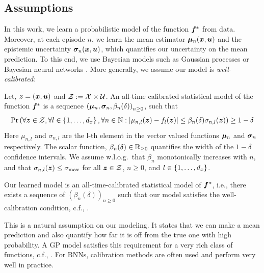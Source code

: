 \subsection{Assumptions}
In this work, we learn a probabilistic model of the function ${\bm{f}}^{*}$ from data. Moreover, at each episode $n$, we learn the mean estimator ${\bm{\mu}}_n({\bm{x}}, {\bm{u}})$ and the epistemic uncertainty ${\bm{\sigma}}_n({\bm{x}}, {\bm{u}})$, which quantifies our uncertainty on the mean prediction. 
To this end, we use Bayesian models such as Gaussian processes \citep[GPs,][]{rasmussen2005gp} or Bayesian neural networks  \citep[BNNs,][]{bnnsurvey}. More generally, we assume our model is {\em well-calibrated}:
\begin{definition}
Let, ${\bm{z}} = ({\bm{x}}, {\bm{u}})$ and ${\mathcal{Z}} := {\mathcal{X}} \times {\mathcal{U}}$. 
 An all-time calibrated statistical model of the function ${\bm{f}}^*$ is a sequence $\left({\bm{\mu}}_n, {\bm{\sigma}}_n, \beta_n(\delta)\right)_{n\geq 0}$, such that
\begin{align*}
    \Pr \left(\forall {\bm{z}} \in {\mathcal{Z}}, \forall l \in \left\{1, \ldots, d_x\right\}, \forall n \in \mathbb{N}: \left\lvert\mu_{n, l}({\bm{z}}) - f_l({\bm{z}})\right\rvert \le \beta_n(\delta) \sigma_{n, l}({\bm{z}}) \right) \geq 1 - \delta 
\end{align*}
 Here $\mu_{n, l}$ and $\sigma_{n, l}$ are the l-th element in the vector valued functions ${\bm{\mu}}_n$ and ${\bm{\sigma}}_n$ respectively. The scalar function, $\beta_n(\delta) \in \mathbb{R}_{\geq 0}$ quantifies the width of the $1-\delta$ confidence intervals. We assume w.l.o.g.~that $\beta_n$ monotonically increases with $n$, and that $\sigma_{n, l}({\bm{z}}) \leq \sigma_{\max}$ for all ${\bm{z}} \in {\mathcal{Z}}$, $n \geq 0$, and $l \in \left\{1, \ldots, d_x\right\}$.
 \label{def:all_time_calibrated_model}
\end{definition}
\begin{assumption}
\label{assumption: Well Calibration Assumption}
   Our learned model is an all-time-calibrated statistical model of ${\bm{f}}^*$, i.e., there exists a sequence of $\left(\beta_{n}(\delta)\right)_{n\geq0}$ such that our model satisfies the well-calibration condition, c.f., .
\end{assumption}
This is a natural assumption on our modeling. It states that we can make a mean prediction and also quantify how far it is off from the true one with high probability. A GP model satisfies this requirement for a very rich class of functions, c.f., . For BNNs, calibration methods \citep{kuleshov2018accurate} are often used and perform very well in practice. 
